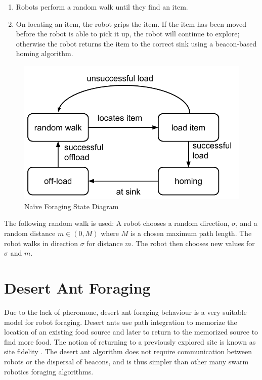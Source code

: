 \begin{enumerate}
	\item Robots perform a random walk until they find an item.
	\item On locating an item, the robot grips the item. If the item has been moved before the robot is able to pick it up, the robot will continue to explore; otherwise the robot returns the item to the correct sink using a beacon-based homing algorithm.
\end{enumerate}
\begin{figure}
	\centering
	\includegraphics[width=\textwidth]{chapters/chapter3/figures/NaiveForaging.pdf}
	\caption{Na\"ive Foraging State Diagram}
	\label{naiveforagestate}
\end{figure}

The following random walk is used: A robot chooses a random direction, $\sigma$, and a random distance $m\in(0,M)$ where $M$ is a chosen maximum path length. The robot walks in direction $\sigma$ for distance $m$. The robot then chooses new values for $\sigma$ and $m$. 


\section{Desert Ant Foraging}

Due to the lack of pheromone, desert ant foraging behaviour is a very suitable model for robot foraging. Desert ants use path integration to memorize the location of an existing food source and later to return to the memorized source to find more food. The notion of returning to a previously explored site is known as site fidelity \cite{switzer1993site}. The desert ant algorithm does not require communication between robots or the dispersal of beacons, and is thus simpler than other many swarm robotics foraging algorithms. 

